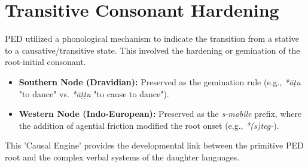 \section{Transitive Consonant Hardening}
PED utilized a phonological mechanism to indicate the transition from a stative to a causative/transitive state. This involved the hardening or gemination of the root-initial consonant.
\begin{itemize}
    \item \textbf{Southern Node (Dravidian):} Preserved as the gemination rule (e.g., \textit{*āṭu} "to dance" vs. \textit{*āṭṭu} "to cause to dance").
    \item \textbf{Western Node (Indo-European):} Preserved as the \textit{s-mobile} prefix, where the addition of agential friction modified the root onset (e.g., \textit{*(s)teg-}).
\end{itemize}
This 'Causal Engine' provides the developmental link between the primitive PED root and the complex verbal systems of the daughter languages.
